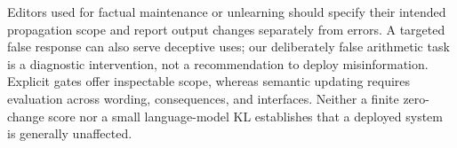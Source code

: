  Editors used for factual maintenance or unlearning should specify their intended propagation scope and report output changes separately from errors. A targeted false response can also serve deceptive uses; our deliberately false arithmetic task is a diagnostic intervention, not a recommendation to deploy misinformation. Explicit gates offer inspectable scope, whereas semantic updating requires evaluation across wording, consequences, and interfaces. Neither a finite zero-change score nor a small language-model KL establishes that a deployed system is generally unaffected.
